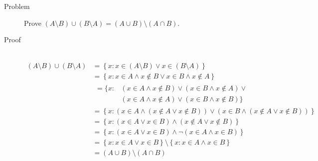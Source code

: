 \begin{description}
\item[Problem]
Prove $(A \setminus B) \cup (B \setminus A) = (A \cup B) \setminus (A \cap B)$.

\item[Proof]~\\
\begin{equation*}
\begin{aligned}
(A \setminus B) \cup (B \setminus A)
        &= \left\{ x : x \in (A \setminus B) \lor x \in (B \setminus A)
           \right\} \\
        &= \left\{ x : x \in A \land x \not \in B \lor x \in B \land x \not
           \in A\right\} \\
        &\begin{aligned}
         = \{ x : &(x \in A \land x \not \in B) \lor
                  (x \in B \land x \not \in A) \lor \\
                  &(x \in A \land x \not \in A) \lor
                  (x \in B \land x \not \in B)\}
        \end{aligned}\\
        &= \left\{ x : (x \in A \land (x \not \in A \lor x \not \in B)) \lor
                       (x \in B \land (x \not \in A \lor x \not \in B))
           \right\} \\
        &= \left\{ x : (x \in A \lor x \in B) \land (x \not \in A \lor x
           \not \in B)\right\} \\
        &= \left\{ x : (x \in A \lor x \in B) \land \neg (x \in A \land x
           \in B)\right\} \\
        &= \left\{ x : x \in A \lor  x \in B\right\} \setminus
           \left\{ x : x \in A \land x \in B\right\} \\
        &= (A \cup B) \setminus (A \cap B)
\end{aligned}
\end{equation*}
\end{description}
